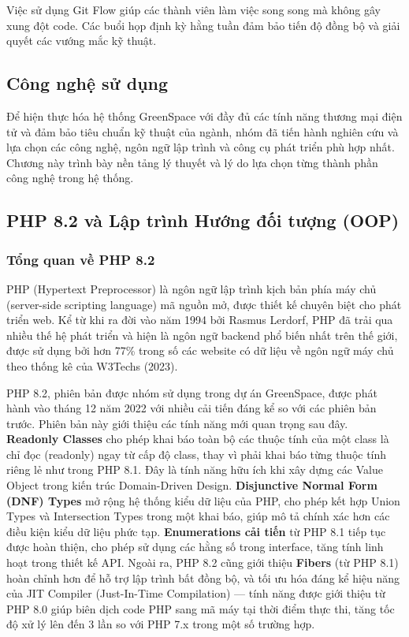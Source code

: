 \documentclass[11pt, a4paper]{article}
\begin{document}
Việc sử dụng Git Flow giúp các thành viên làm việc song song mà không gây xung đột code. Các buổi họp định kỳ hằng tuần đảm bảo tiến độ đồng bộ và giải quyết các vướng mắc kỹ thuật.

\subsection{Công nghệ sử dụng}

Để hiện thực hóa hệ thống GreenSpace với đầy đủ các tính năng thương mại điện tử và đảm bảo tiêu chuẩn kỹ thuật của ngành, nhóm đã tiến hành nghiên cứu và lựa chọn các công nghệ, ngôn ngữ lập trình và công cụ phát triển phù hợp nhất. Chương này trình bày nền tảng lý thuyết và lý do lựa chọn từng thành phần công nghệ trong hệ thống.

\subsection{PHP 8.2 và Lập trình Hướng đối tượng (OOP)}

\subsubsection{Tổng quan về PHP 8.2}

PHP (Hypertext Preprocessor) là ngôn ngữ lập trình kịch bản phía máy chủ (server-side scripting language) mã nguồn mở, được thiết kế chuyên biệt cho phát triển web. Kể từ khi ra đời vào năm 1994 bởi Rasmus Lerdorf, PHP đã trải qua nhiều thế hệ phát triển và hiện là ngôn ngữ backend phổ biến nhất trên thế giới, được sử dụng bởi hơn 77\% trong số các website có dữ liệu về ngôn ngữ máy chủ theo thống kê của W3Techs (2023).

PHP 8.2, phiên bản được nhóm sử dụng trong dự án GreenSpace, được phát hành vào tháng 12 năm 2022 với nhiều cải tiến đáng kể so với các phiên bản trước. Phiên bản này giới thiệu các tính năng mới quan trọng sau đây. \textbf{Readonly Classes} cho phép khai báo toàn bộ các thuộc tính của một class là chỉ đọc (readonly) ngay từ cấp độ class, thay vì phải khai báo từng thuộc tính riêng lẻ như trong PHP 8.1. Đây là tính năng hữu ích khi xây dựng các Value Object trong kiến trúc Domain-Driven Design. \textbf{Disjunctive Normal Form (DNF) Types} mở rộng hệ thống kiểu dữ liệu của PHP, cho phép kết hợp Union Types và Intersection Types trong một khai báo, giúp mô tả chính xác hơn các điều kiện kiểu dữ liệu phức tạp. \textbf{Enumerations cải tiến} từ PHP 8.1 tiếp tục được hoàn thiện, cho phép sử dụng các hằng số trong interface, tăng tính linh hoạt trong thiết kế API. Ngoài ra, PHP 8.2 cũng giới thiệu \textbf{Fibers} (từ PHP 8.1) hoàn chỉnh hơn để hỗ trợ lập trình bất đồng bộ, và tối ưu hóa đáng kể hiệu năng của JIT Compiler (Just-In-Time Compilation) --- tính năng được giới thiệu từ PHP 8.0 giúp biên dịch code PHP sang mã máy tại thời điểm thực thi, tăng tốc độ xử lý lên đến 3 lần so với PHP 7.x trong một số trường hợp.
\end{document}
